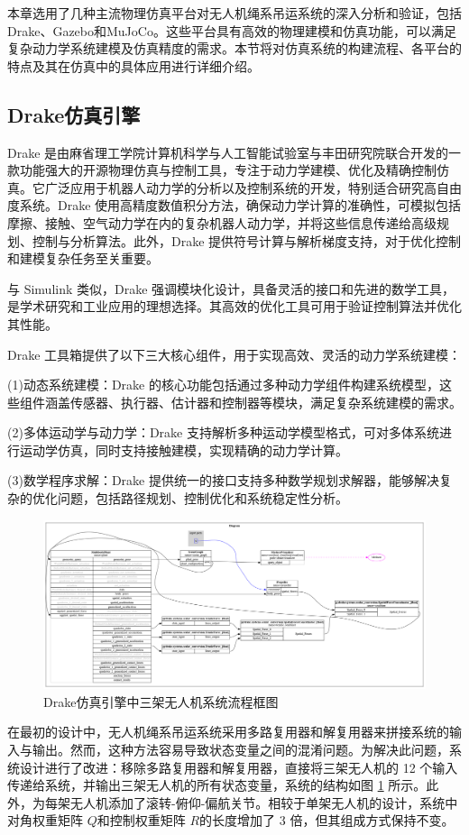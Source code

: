 \documentclass[lang=chs, degree=master, blindreview=false, winfonts=true]{yanputhesis}
\begin{document}
本章选用了几种主流物理仿真平台对无人机绳系吊运系统的深入分析和验证，包括Drake、Gazebo和MuJoCo。这些平台具有高效的物理建模和仿真功能，可以满足复杂动力学系统建模及仿真精度的需求。本节将对仿真系统的构建流程、各平台的特点及其在仿真中的具体应用进行详细介绍。

\subsection{Drake仿真引擎}
Drake 是由麻省理工学院计算机科学与人工智能试验室与丰田研究院联合开发的一款功能强大的开源物理仿真与控制工具，专注于动力学建模、优化及精确控制仿真。它广泛应用于机器人动力学的分析以及控制系统的开发，特别适合研究高自由度系统。Drake 使用高精度数值积分方法，确保动力学计算的准确性，可模拟包括摩擦、接触、空气动力学在内的复杂机器人动力学，并将这些信息传递给高级规划、控制与分析算法。此外，Drake 提供符号计算与解析梯度支持，对于优化控制和建模复杂任务至关重要。

与 Simulink 类似，Drake 强调模块化设计，具备灵活的接口和先进的数学工具，是学术研究和工业应用的理想选择。其高效的优化工具可用于验证控制算法并优化其性能。

Drake 工具箱提供了以下三大核心组件，用于实现高效、灵活的动力学系统建模：

(1)动态系统建模：Drake 的核心功能包括通过多种动力学组件构建系统模型，这些组件涵盖传感器、执行器、估计器和控制器等模块，满足复杂系统建模的需求。

(2)多体运动学与动力学：Drake 支持解析多种运动学模型格式，可对多体系统进行运动学仿真，同时支持接触建模，实现精确的动力学计算。

(3)数学程序求解：Drake 提供统一的接口支持多种数学规划求解器，能够解决复杂的优化问题，包括路径规划、控制优化和系统稳定性分析。

\begin{figure}[hbt!]
	\centering
	\includegraphics[width=38pc]{picture/drake.png} 
	\caption{Drake仿真引擎中三架无人机系统流程框图} 
	\label{drake}
\end{figure}
在最初的设计中，无人机绳系吊运系统采用多路复用器和解复用器来拼接系统的输入与输出。然而，这种方法容易导致状态变量之间的混淆问题。为解决此问题，系统设计进行了改进：移除多路复用器和解复用器，直接将三架无人机的 12 个输入传递给系统，并输出三架无人机的所有状态变量，系统的结构如图 \ref{drake} 所示。此外，为每架无人机添加了滚转-俯仰-偏航关节。相较于单架无人机的设计，系统中对角权重矩阵 $Q$和控制权重矩阵 $R$的长度增加了 3 倍，但其组成方式保持不变。
\end{document}

